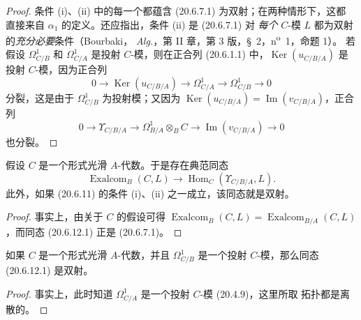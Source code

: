 \begin{proof}
条件 (i)、(ii) 中的每一个都蕴含 (20.6.7.1) 为双射；在两种情形下，这都
直接来自 $\alpha_1$ 的定义。还应指出，条件 (ii) 是 (20.6.7.1) 对
\emph{每个} $C$-模 $L$ 都为双射的\emph{充分必要}条件（Bourbaki，
\emph{Alg.}，第 II 章，第 3 版，\S~2，n\textsuperscript{o}~1，命题 1）。
若假设 $\Omega^1_{C/B}$ 和 $\Omega^1_{C/A}$ 是投射 $C$-模，则在正合列
(20.6.1.1) 中，$\operatorname{Ker}(u_{C/B/A})$ 是投射 $C$-模，因为正合列
\[
  0\longrightarrow\operatorname{Ker}(u_{C/B/A})\longrightarrow\Omega^1_{C/A}
  \longrightarrow\Omega^1_{C/B}\longrightarrow0
\]
分裂，这是由于 $\Omega^1_{C/B}$ 为投射模；又因为
$\operatorname{Ker}(u_{C/B/A})=\operatorname{Im}(v_{C/B/A})$，正合列
\[
  0\longrightarrow\Upsilon_{C/B/A}\longrightarrow
  \Omega^1_{B/A}\otimes_B C\longrightarrow
  \operatorname{Im}(v_{C/B/A})\longrightarrow0
\]
也分裂。
\end{proof}

\begin{corollary}[20.6.12]
\label{0.20.6.12-fr}
假设 $C$ 是一个形式光滑 $A$-代数。于是存在典范同态
\begin{equation}
\tag{20.6.12.1}
\label{0.20.6.12.1-fr}
  \operatorname{Exalcom}_B(C,L)\longrightarrow
  \operatorname{Hom}_C(\Upsilon_{C/B/A},L).
\end{equation}
此外，如果 (20.6.11) 的条件 (i)、(ii) 之一成立，该同态就是双射。
\end{corollary}

\begin{proof}
事实上，由关于 $C$ 的假设可得
$\operatorname{Exalcom}_B(C,L)=\operatorname{Exalcom}_{B/A}(C,L)$，而同态
(20.6.12.1) 正是 (20.6.7.1)。
\end{proof}

\begin{corollary}[20.6.13]
\label{0.20.6.13-fr}
如果 $C$ 是一个形式光滑 $A$-代数，并且 $\Omega^1_{C/B}$ 是一个投射
$C$-模，那么同态 (20.6.12.1) 是双射。
\end{corollary}

\begin{proof}
事实上，此时知道 $\Omega^1_{C/A}$ 是一个投射 $C$-模 (20.4.9)，这里所取
拓扑都是离散的。
\end{proof}


